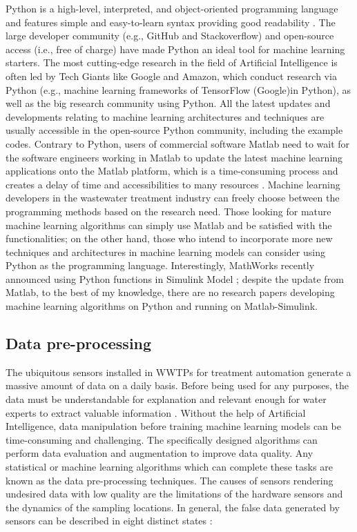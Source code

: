 Python is a high-level, interpreted, and object-oriented programming language and features simple and easy-to-learn syntax providing good readability \citep{pythonsoftwarefundationWhatPythonExecutive2022}. The large developer community (e.g., GitHub and Stackoverflow) and open-source access (i.e., free of charge) have made Python an ideal tool for machine learning starters. The most cutting-edge research in the field of Artificial Intelligence is often led by Tech Giants like Google and Amazon, which conduct research via Python (e.g., machine learning frameworks of TensorFlow (Google)in Python), as well as the big research community using Python. All the latest updates and developments relating to machine learning architectures and techniques are usually accessible in the open-source Python community, including the example codes. Contrary to Python, users of commercial software Matlab need to wait for the software engineers working in Matlab to update the latest machine learning applications onto the Matlab platform, which is a time-consuming process and creates a delay of time and accessibilities to many resources \citep{castroWhyShouldChoose2018}. Machine learning developers in the wastewater treatment industry can freely choose between the programming methods based on the research need. Those looking for mature machine learning algorithms can simply use Matlab and be satisfied with the functionalities; on the other hand, those who intend to incorporate more new techniques and architectures in machine learning models can consider using Python as the programming language. Interestingly, MathWorks recently announced using Python functions in Simulink Model \citep{mathworksCallPythonFunction2022}; despite the update from Matlab, to the best of my knowledge, there are no research papers developing machine learning algorithms on Python and running on Matlab-Simulink.

\subsection{Data pre-processing}
The ubiquitous sensors installed in WWTPs for treatment automation generate a massive amount of data on a daily basis. Before being used for any purposes, the data must be understandable for explanation and relevant enough for water experts to extract valuable information \citep{kehreinCriticalReviewResource2020}. Without the help of Artificial Intelligence, data manipulation before training machine learning models can be time-consuming and challenging. The specifically designed algorithms can perform data evaluation and augmentation to improve data quality. Any statistical or machine learning algorithms which can complete these tasks are known as the data pre-processing techniques. The causes of sensors rendering undesired data with low quality are the limitations of the hardware sensors and the dynamics of the sampling locations. In general, the false data generated by sensors can be described in eight distinct states \citep{rosenAddingRealismSimulated2008,newhartDatadrivenPerformanceAnalyses2019}:

